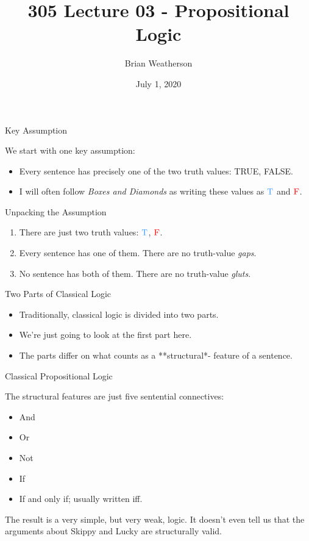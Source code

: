\documentclass[ignorenonframetext,]{beamer}
\title{305 Lecture 03 - Propositional Logic}
\author{Brian Weatherson}
\date{July 1, 2020}
\providecommand{\tightlist}{%
  \setlength{\itemsep}{0pt}\setlength{\parskip}{0pt}}
\renewcommand{\,}{\text{, }}
\def\True{\textcolor{dodgerblue}{\text{T}}}
\def\False{\textcolor{red}{\text{F}}}
\begin{document}
\frame{\titlepage}

\begin{frame}{Key Assumption}
\protect\hypertarget{key-assumption}{}

We start with one key assumption:

\begin{itemize}
\tightlist
\item
  Every sentence has precisely one of the two truth values: TRUE, FALSE.
\item
  I will often follow \emph{Boxes and Diamonds} as writing these values
  as \(\True\) and \(\False\).
\end{itemize}

\end{frame}

\begin{frame}{Unpacking the Assumption}
\protect\hypertarget{unpacking-the-assumption}{}

\begin{enumerate}
\tightlist
\item
  There are just two truth values: \(\True\), \(\False\).\\
\item
  Every sentence has one of them. There are no truth-value \emph{gaps}.
\item
  No sentence has both of them. There are no truth-value \emph{gluts}.
\end{enumerate}

\end{frame}

\begin{frame}{Two Parts of Classical Logic}
\protect\hypertarget{two-parts-of-classical-logic}{}

\begin{itemize}
\tightlist
\item
  Traditionally, classical logic is divided into two parts.
\item
  We're just going to look at the first part here.
\item
  The parts differ on what counts as a **structural*- feature of a
  sentence.
\end{itemize}

\end{frame}

\begin{frame}{Classical Propositional Logic}
\protect\hypertarget{classical-propositional-logic}{}

The structural features are just five sentential connectives:

\begin{itemize}
\tightlist
\item
  And
\item
  Or
\item
  Not
\item
  If
\item
  If and only if; usually written iff.
\end{itemize}

The result is a very simple, but very weak, logic. It doesn't even tell
us that the arguments about Skippy and Lucky are structurally valid.

\end{frame}
\end{document}
